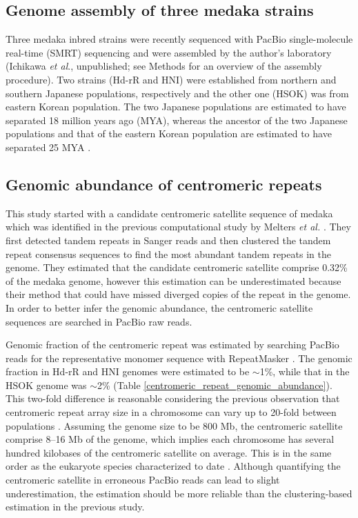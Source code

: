 \subsection*{Genome assembly of three medaka strains}
  Three medaka inbred strains were recently sequenced with PacBio single-molecule real-time (SMRT) sequencing and were assembled by the author's laboratory (Ichikawa \textit{et al}., unpublished; see Methods for an overview of the assembly procedure). Two strains (Hd-rR and HNI) were established from northern and southern Japanese populations, respectively and the other one (HSOK) was from eastern Korean population. The two Japanese populations are estimated to have separated 18 million years ago (MYA), whereas the ancestor of the two Japanese populations and that of the eastern Korean population are estimated to have separated 25 MYA \cite{Setiamarga2009}.


\subsection*{Genomic abundance of centromeric repeats}
  This study started with a candidate centromeric satellite sequence of medaka which was identified in the previous computational study by Melters \textit{et al.} \cite{Melters2013}. They first detected tandem repeats in Sanger reads and then clustered the tandem repeat consensus sequences to find the most abundant tandem repeats in the genome. They estimated that the candidate centromeric satellite comprise 0.32\% of the medaka genome, however this estimation can be underestimated because their method that could have missed diverged copies of the repeat in the genome. In order to better infer the genomic abundance, the centromeric satellite sequences are searched in PacBio raw reads.

  Genomic fraction of the centromeric repeat was estimated by searching PacBio reads for the representative monomer sequence with RepeatMasker \cite{Smit}. The genomic fraction in Hd-rR and HNI genomes were estimated to be $\sim$1\%, while that in the HSOK genome was $\sim$2\% (Table \ref{centromeric_repeat_genomic_abundance}). This two-fold difference is reasonable considering the previous observation that centromeric repeat array size in a chromosome can vary up to 20-fold between populations \cite{Miga2014}. Assuming the genome size to be 800 Mb, the centromeric satellite comprise 8--16 Mb of the genome, which implies each chromosome has several hundred kilobases of the centromeric satellite on average. This is in the same order as the eukaryote species characterized to date \cite{Plohl2014}. Although quantifying the centromeric satellite in erroneous PacBio reads can lead to slight underestimation, the estimation should be more reliable than the clustering-based estimation in the previous study.


